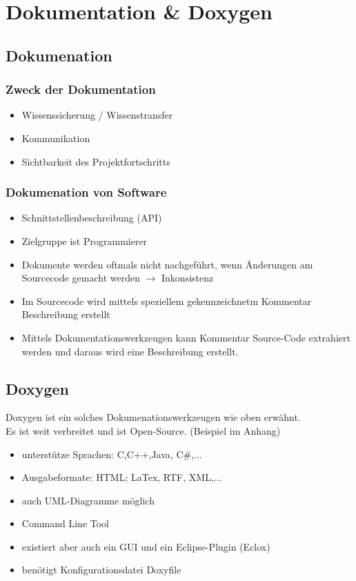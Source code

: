 \section{Dokumentation \& Doxygen}
\subsection{Dokumenation}
\subsubsection{Zweck der Dokumentation}
\begin{itemize}
	\item Wissenssicherung / Wissenstransfer
	\item Kommunikation
	\item Sichtbarkeit des Projektfortschritts
\end{itemize}
\subsubsection{Dokumenation von Software}
\begin{itemize}
	\item Schnittstellenbeschreibung (API)
	\item Zielgruppe ist Programmierer
	\item Dokumente werden oftmals nicht nachgeführt, wenn Änderungen am Sourcecode gemacht werden $\rightarrow$ Inkonsistenz
	\item Im Sourcecode wird mittels speziellem gekennzeichnetm Kommentar Beschreibung erstellt
	\item Mittels Dokumentationswerkzeugen kann Kommentar Source-Code extrahiert werden und daraus wird eine Beschreibung erstellt.  
\end{itemize}
\subsection{Doxygen}
Doxygen ist ein solches Dokumenationswerkzeugen wie oben erwähnt.\\
Es ist weit verbreitet und ist Open-Source. (Beispiel im Anhang)
\begin{itemize}
	\item unterstütze Sprachen: C,C++,Java, C\#,...
	\item Ausgabeformate: HTML; LaTex, RTF, XML,...
	\item auch UML-Diagramme möglich
	\item Command Line Tool
	\item existiert aber auch ein GUI und ein Eclipse-Plugin (Eclox)
	\item benötigt Konfigurationsdatei Doxyfile 
\end{itemize}

